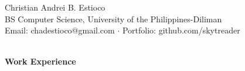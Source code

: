 \documentclass{article}
\begin{document}
  
  \newcommand{\resumesection}[1]{\noindent \textbf{{\large #1}}}
  \newcommand{\breather}{\vspace{0.15in}}
  \newcommand{\ctilde}{\raise.17ex\hbox{$\sim$}}
  \newcommand{\techused}[1]{\small \textbf{Tech used:} #1}

  \pagestyle{empty}
  
  \noindent\textsf{\LARGE Christian Andrei B. Estioco}\\
  \textsf{\large BS Computer Science, University of the Philippines-Diliman\\
  Email: chadestioco@gmail.com $\cdot$ Portfolio: github.com/skytreader}
  \hline

  \vspace{0.1in}
  \vspace{0.2in}
  \\
  \resumesection{Work Experience}
\end{document}
